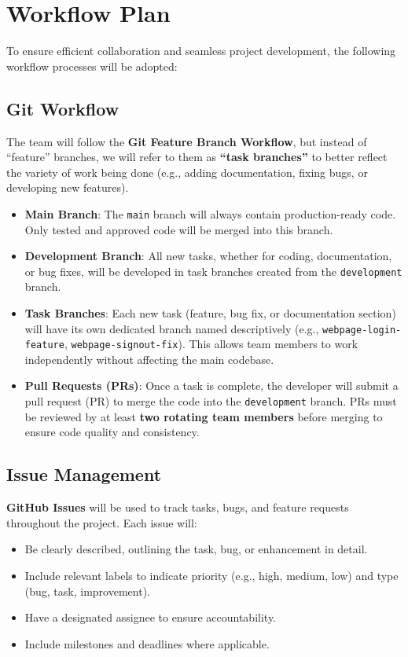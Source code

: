 \documentclass{article}
\begin{document}
\section{Workflow Plan}
To ensure efficient collaboration and seamless project development, the following workflow processes will be adopted:

\subsection{Git Workflow}
The team will follow the \textbf{Git Feature Branch Workflow}, but instead of ``feature'' branches, we will refer to them as \textbf{``task branches''} to better reflect the variety of work being done (e.g., adding documentation, fixing bugs, or developing new features).

\begin{itemize}
    \item \textbf{Main Branch}: The \texttt{main} branch will always contain production-ready code. Only tested and approved code will be merged into this branch.
    \item \textbf{Development Branch}: All new tasks, whether for coding, documentation, or bug fixes, will be developed in task branches created from the \texttt{development} branch.
    \item \textbf{Task Branches}: Each new task (feature, bug fix, or documentation section) will have its own dedicated branch named descriptively (e.g., \texttt{webpage-login-feature}, \texttt{webpage-signout-fix}). This allows team members to work independently without affecting the main codebase.
    \item \textbf{Pull Requests (PRs)}: Once a task is complete, the developer will submit a pull request (PR) to merge the code into the \texttt{development} branch. PRs must be reviewed by at least \textbf{two rotating team members} before merging to ensure code quality and consistency.
\end{itemize}

\subsection{Issue Management}
\textbf{GitHub Issues} will be used to track tasks, bugs, and feature requests throughout the project. Each issue will:
\begin{itemize}
    \item Be clearly described, outlining the task, bug, or enhancement in detail.
    \item Include relevant labels to indicate priority (e.g., high, medium, low) and type (bug, task, improvement).
    \item Have a designated assignee to ensure accountability.
    \item Include milestones and deadlines where applicable.
\end{itemize}
\end{document}
